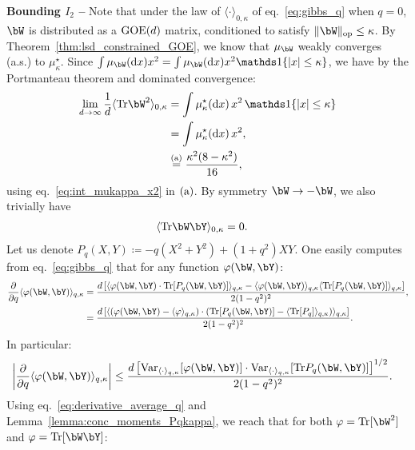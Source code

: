 {\myskip 
\textbf{Bounding $I_2$ --}
Note that under the law of $\langle \cdot \rangle_{0,\kappa}$ of eq.~\eqref{eq:gibbs_q} when $q = 0$,
$\bW$ is distributed as a $\mathrm{GOE}(d)$ matrix, conditioned to satisfy $\|\bW\|_\op \leq \kappa$.
By Theorem~\ref{thm:lsd_constrained_GOE}, we know that $\mu_\bW$ weakly converges (a.s.) to $\mu_\kappa^\star$.
Since $\int \mu_\bW(\rd x) x^2 = \int \mu_\bW(\rd x) x^2 \indi\{|x| \leq \kappa\}$, we have by the Portmanteau theorem 
and dominated convergence: 
\begin{align}
    \label{eq:limit_TrW2_q0}
    \nonumber
    \lim_{d \to \infty} \frac{1}{d}\langle\Tr \bW^2\rangle_{0, \kappa} &= \int \mu_\kappa^\star(\rd x) \, x^2 \, \indi\{|x| \leq \kappa\} \\ 
    &= \int \mu_\kappa^\star(\rd x) \, x^2, \\
    &\aeq \frac{\kappa^2 (8-\kappa^2)}{16},
\end{align}
using eq.~\eqref{eq:int_mukappa_x2} in $(\rm a)$.
By symmetry $\bW \to -\bW$, we also trivially have
\begin{align}
    \label{eq:limit_TrWY_q0}
    \langle\Tr \bW \bY\rangle_{0, \kappa} &= 0.
\end{align}
Let us denote $P_q(X, Y) \coloneqq - q (X^2 + Y^2) + (1+q^2) X Y$. 
One easily computes from eq.~\eqref{eq:gibbs_q} that 
for any function $\varphi(\bW, \bY)$: 
\begin{align*}
    \frac{\partial}{\partial q}\langle \varphi(\bW, \bY)\rangle_{q,\kappa} 
    &= \frac{d \left[\langle \varphi(\bW, \bY) \cdot \Tr[P_q(\bW, \bY)] \rangle_{q, \kappa} - \langle \varphi(\bW, \bY) \rangle_{q, \kappa} \langle \Tr[P_q(\bW, \bY)] \rangle_{q, \kappa}\right]}{2(1-q^2)^2}, \\ 
    &= \frac{d \left[\langle \left(\varphi(\bW, \bY) - \langle \varphi \rangle_{q, \kappa}\right) \cdot \left(\Tr[P_q(\bW, \bY)] - \langle \Tr[P_q]\rangle_{q, \kappa}\right) \rangle_{q, \kappa}\right]}{2(1-q^2)^2}.
\end{align*}
In particular:
\begin{align}\label{eq:derivative_average_q}
    \left|\frac{\partial}{\partial q}\langle \varphi(\bW, \bY)\rangle_{q,\kappa}\right| 
    &\leq \frac{d \left[\Var_{\langle \cdot \rangle_{q, \kappa}}[\varphi(\bW, \bY)] \cdot \Var_{\langle \cdot \rangle_{q, \kappa}}[\Tr P_q(\bW, \bY)]\right]^{1/2}}{2(1-q^2)^2}.
\end{align}
Using eq.~\eqref{eq:derivative_average_q} and Lemma~\ref{lemma:conc_moments_Pqkappa}, 
we reach that for both $\varphi = \Tr[\bW^2]$ and $\varphi = \Tr[\bW \bY]$: 
}
